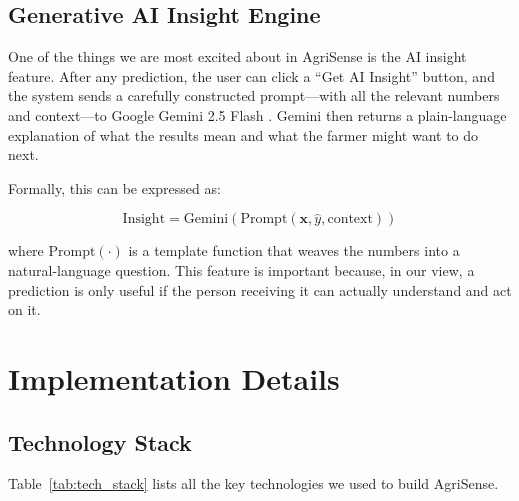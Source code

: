 \documentclass[conference]{IEEEtran}
\begin{document}
\subsection{Generative AI Insight Engine}
One of the things we are most excited about in AgriSense is the AI insight feature. After any prediction, the user can click a ``Get AI Insight'' button, and the system sends a carefully constructed prompt---with all the relevant numbers and context---to Google Gemini 2.5 Flash \cite{google2024gemini}. Gemini then returns a plain-language explanation of what the results mean and what the farmer might want to do next.

Formally, this can be expressed as:

\begin{equation}
\text{Insight} = \text{Gemini}(\text{Prompt}(\mathbf{x}, \hat{y}, \text{context}))
\end{equation}

where $\text{Prompt}(\cdot)$ is a template function that weaves the numbers into a natural-language question. This feature is important because, in our view, a prediction is only useful if the person receiving it can actually understand and act on it.

\section{Implementation Details}
\label{sec:implementation}

\subsection{Technology Stack}
Table~\ref{tab:tech_stack} lists all the key technologies we used to build AgriSense.
\end{document}
